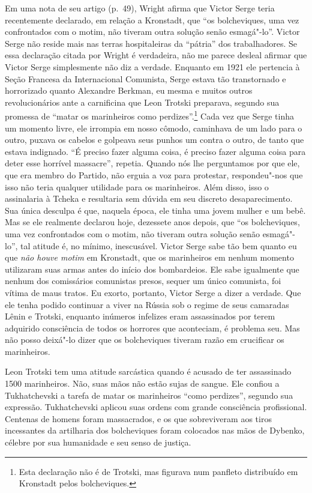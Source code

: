 Em uma nota de seu artigo (p.~49), Wright afirma que Victor Serge teria
recentemente declarado, em relação a Kronstadt, que “os bolcheviques,
uma vez confrontados com o motim, não tiveram outra solução senão
esmagá"-lo”. Victor Serge não reside mais nas terras hospitaleiras da
“pátria” dos trabalhadores. Se essa declaração citada por Wright é
verdadeira, não me parece desleal afirmar que Victor Serge simplesmente
não diz a verdade. Enquanto em 1921 ele pertencia à Seção Francesa da
Internacional Comunista, Serge estava tão transtornado e horrorizado
quanto Alexandre Berkman, eu mesma e muitos outros revolucionários ante
a carnificina que Leon Trotski preparava, segundo sua promessa de
“matar os marinheiros como perdizes”.\footnote{
Esta declaração não é de Trotski, mas figurava num panfleto
distribuído em Kronstadt pelos bolcheviques.} 
Cada vez que Serge tinha um
momento livre, ele irrompia em nosso cômodo, caminhava de um lado para
o outro, puxava os cabelos e golpeava seus punhos um contra o outro, de
tanto que estava indignado. “É preciso fazer alguma coisa, é preciso
fazer alguma coisa para deter esse horrível massacre”, repetia. Quando
nós lhe perguntamos por que ele, que era membro do Partido, não erguia
a voz para protestar, respondeu"-nos que isso não teria qualquer
utilidade para os marinheiros. Além disso, isso o assinalaria à Tcheka
e resultaria sem dúvida em seu discreto desaparecimento. Sua única
desculpa é que, naquela época, ele tinha uma jovem mulher e um bebê. Mas
se ele realmente declarou hoje, dezessete anos depois, que “os
bolcheviques, uma vez confrontados com o motim, não tiveram outra solução
senão esmagá"-lo”, tal atitude é, no mínimo, inescusável. Victor Serge
sabe tão bem quanto eu que \textit{não houve motim} em Kronstadt, que os 
marinheiros em nenhum momento utilizaram suas armas antes do início dos
bombardeios. Ele sabe igualmente que nenhum dos comissários comunistas
presos, sequer um único comunista, foi vítima de maus tratos. Eu
exorto, portanto, Victor Serge a dizer a verdade. Que ele tenha podido
continuar a viver na Rússia sob o regime de seus camaradas Lênin e
Trotski, enquanto inúmeros infelizes eram assassinados por terem
adquirido consciência de todos os horrores que aconteciam, é 
problema seu. Mas não posso deixá"-lo dizer que os bolcheviques tiveram
razão em crucificar os marinheiros.

Leon Trotski tem uma atitude sarcástica quando é acusado de ter
assassinado 1500 marinheiros. Não, suas mãos não estão sujas de
sangue. Ele confiou a Tukhatchevski a tarefa de matar os marinheiros
“como perdizes”, segundo sua expressão. Tukhatchevski aplicou suas
ordens com grande consciência profissional. Centenas de homens foram
massacrados, e os que sobreviveram aos tiros incessantes da artilharia
dos bolcheviques foram colocados nas mãos de Dybenko, célebre por sua
humanidade e seu senso de justiça.

